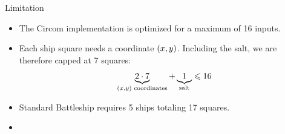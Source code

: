 \begin{frame}{Limitation}
    \begin{itemize}
        \item {} The Circom implementation is optimized for a maximum of 16 inputs.
        \item {} Each ship square needs a coordinate $\left(x, y\right)$. Including the salt, we are therefore capped at 7 squares:
        \begin{equation*}
            \underbrace{2 \cdot 7}_{\left(x, y\right) \text{ coordinates}} + \underbrace{1}_{\text{salt}} \leqslant 16
        \end{equation*}
        
        \item {} Standard Battleship requires 5 ships totaling 17 squares.
        \item {}
    \end{itemize}
\end{frame}
